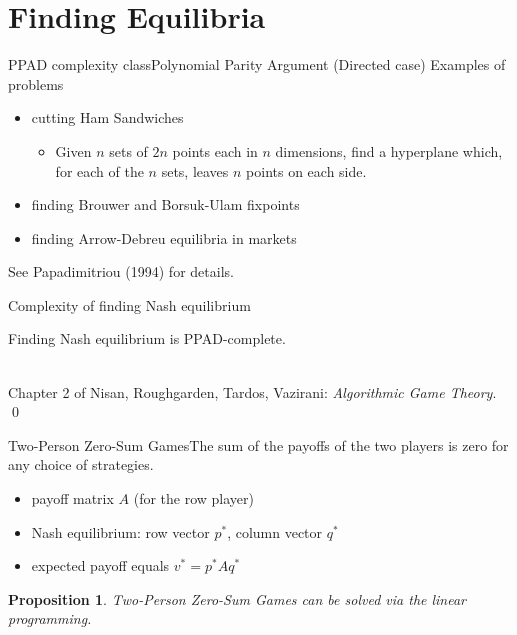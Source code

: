 \documentclass{beamer}
\newtheorem{proposition}{Proposition}
\begin{document}
\section{Finding Equilibria}

\begin{frame}{PPAD complexity class}{Polynomial Parity Argument (Directed case)}
  Examples of problems
  \pause
  \begin{itemize}

    \item cutting Ham Sandwiches
      \begin{itemize}
        \item Given $n$ sets of $2n$ points each in $n$ dimensions, find a
          hyperplane which, for each of the $n$ sets, leaves $n$ points on each
          side.
      \end{itemize}
  \pause

    \item finding Brouwer and Borsuk-Ulam fixpoints
  \pause

    \item finding Arrow-Debreu equilibria in markets
  \pause
  \end{itemize}
  See Papadimitriou (1994) for details.
\end{frame}

\begin{frame}{Complexity of finding Nash equilibrium}
  \pause
  \begin{theorem}
    Finding Nash equilibrium is PPAD-complete.
  \end{theorem}

  \pause
   \\
    Chapter 2 of Nisan, Roughgarden, Tardos, Vazirani: \emph{Algorithmic Game
      Theory}.
    \qed
\end{frame}

\begin{frame}{Two-Person Zero-Sum Games}{The sum of the payoffs of the two
    players is zero for any choice of strategies.}
  \pause
  \begin{itemize}
    \item payoff matrix $A$ (for the row player)
  \pause
    \item Nash equilibrium: row vector $p^*$, column vector $q^*$ 
  \pause
    \item expected payoff equals $v^* = p^*Aq^*$
  \pause
  \end{itemize}

  \begin{proposition}
    Two-Person Zero-Sum Games can be solved via the linear programming.
  \end{proposition}
\end{frame}
\end{document}
